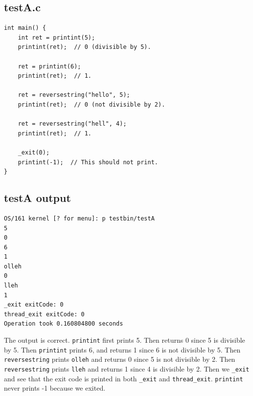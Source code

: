\documentclass[10pt]{article}
\begin{document}
\subsection*{testA.c}
\begin{verbatim}
int main() {
    int ret = printint(5);
    printint(ret);  // 0 (divisible by 5).

    ret = printint(6);
    printint(ret);  // 1.

    ret = reversestring("hello", 5);
    printint(ret);  // 0 (not divisible by 2).

    ret = reversestring("hell", 4);
    printint(ret);  // 1.

    _exit(0);
    printint(-1);  // This should not print.
}
\end{verbatim}

\subsection*{testA output}
\begin{verbatim}
OS/161 kernel [? for menu]: p testbin/testA
5
0
6
1
olleh
0
lleh
1
_exit exitCode: 0
thread_exit exitCode: 0
Operation took 0.160804800 seconds
\end{verbatim}

The output is correct. \verb|printint| first prints 5. Then returns 0 since 5 is divisible by 5.
Then \verb|printint| prints 6, and returns 1 since 6 is not divisible by 5.
Then \verb|reversestring| prints \verb|olleh| and returns 0 since 5 is not divisible by 2.
Then \verb|reversestring| prints \verb|lleh| and returns 1 since 4 is divisible by 2.
Then we \verb|_exit| and see that the exit code is printed in both \verb|_exit| and \verb|thread_exit|.
\verb|printint| never prints -1 because we exited.
\end{document}
